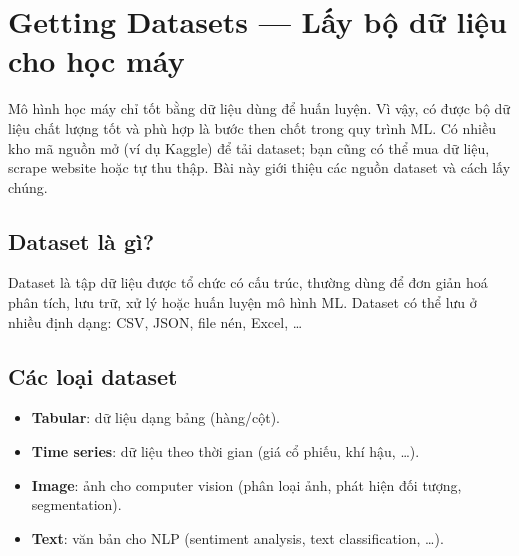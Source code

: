 \section{Getting Datasets --- Lấy bộ dữ liệu cho học máy}

\begin{dongco}[title={Mô hình chỉ tốt bằng dữ liệu huấn luyện}]
Mô hình học máy chỉ tốt bằng dữ liệu dùng để huấn luyện.
Vì vậy, có được bộ dữ liệu chất lượng tốt và phù hợp là bước then chốt trong quy trình ML.
Có nhiều kho mã nguồn mở (ví dụ Kaggle) để tải dataset; bạn cũng có thể mua dữ liệu, scrape website hoặc tự thu thập.
Bài này giới thiệu các nguồn dataset và cách lấy chúng.
\end{dongco}

\begin{vidu}[title={Hình minh hoạ dữ liệu cho ML}]
\end{vidu}

\subsection{Dataset là gì?}

\begin{dinhnghia}[title={Dataset}]
Dataset là tập dữ liệu được tổ chức có cấu trúc, thường dùng để đơn giản hoá phân tích, lưu trữ, xử lý hoặc huấn luyện mô hình ML.
Dataset có thể lưu ở nhiều định dạng: CSV, JSON, file nén, Excel, \ldots
\end{dinhnghia}

\subsection{Các loại dataset}

\begin{phuongphap}[title={Phân loại theo kiểu thông tin}]
\begin{itemize}
  \item \textbf{Tabular}: dữ liệu dạng bảng (hàng/cột).
  \item \textbf{Time series}: dữ liệu theo thời gian (giá cổ phiếu, khí hậu, \ldots).
  \item \textbf{Image}: ảnh cho computer vision (phân loại ảnh, phát hiện đối tượng, segmentation).
  \item \textbf{Text}: văn bản cho NLP (sentiment analysis, text classification, \ldots).
\end{itemize}
\end{phuongphap}


